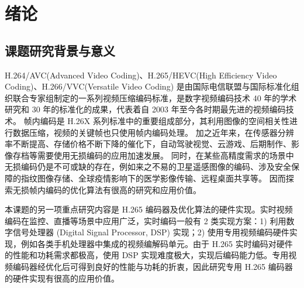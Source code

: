 
\chapter{绪论}
\label{cha:c1}

\section{课题研究背景与意义}
H.264/AVC(Advanced Video Coding)、H.265/HEVC(High Efficiency Video Coding)、H.266/VVC(Versatile Video Coding) 是由国际电信联盟与国际标准化组织联合专家组制定的一系列视频压缩编码标准，是数字视频编码技术 40 年的学术研究和 30 年的标准化的成果，代表着自 2003 年至今各时期最先进的视频编码技术。
帧内编码是 H.26X 系列标准中的重要组成部分，其利用图像的空间相关性进行数据压缩，视频的关键帧也只使用帧内编码处理。
加之近年来，在传感器分辨率不断提高、存储价格不断下降的催化下，自动驾驶视觉、云游戏、后期制作、影像存档等需要使用无损编码的应用加速发展。
同时，在某些高精度需求的场景中无损编码仍是不可或缺的存在，例如来之不易的卫星遥感图像的编码、涉及安全保障的指纹图像存储、全球疫情影响下的医学影像传输、远程桌面共享等。
因而探索无损帧内编码的优化算法有很高的研究和应用价值。

本课题的另一项重点研究内容是 H.265 编码器及优化算法的硬件实现。实时视频编码在监控、直播等场景中应用广泛，实时编码一般有 2 类实现方案：1) 利用数字信号处理器 (Digital Signal Processor, DSP) 实现；2) 使用专用视频编码硬件实现，例如各类手机处理器中集成的视频编解码单元。由于 H.265 实时编码对硬件的性能和功耗需求都极高，使用 DSP 实现难度极大，实现后编码能力低。专用视频编码器经优化后可得到良好的性能与功耗的折衷，因此研究专用 H.265 编码器的硬件实现有很高的应用价值。

